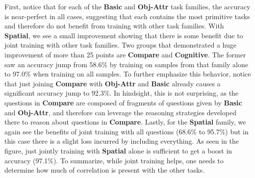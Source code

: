 First, notice that for each of the \textbf{Basic} and \textbf{Obj-Attr} task families, the accuracy is near-perfect in all cases, suggesting that each contains the most primitive tasks and therefore do not benefit from training with other task families.
With \textbf{Spatial}, we see a small improvement showing that there is some benefit due to joint training with other task families.
Two groups that demonstrated a huge improvement of more than 25 points are \textbf{Compare} and \textbf{Cognitive}.
The former saw an accuracy jump from 58.6\% by training on samples from that family alone
to 97.0\% when training on all samples. To further emphasize this behavior, notice that
just joining \textbf{Compare} with \textbf{Obj-Attr} and \textbf{Basic} already causes a significant accuracy jump to 92.3\%.
In hindsight, this is not surprising, as the questions in \textbf{Compare} are composed
of fragments of questions given by \textbf{Basic} and \textbf{Obj-Attr}, and therefore can leverage the reasoning strategies developed there to reason about questions in \textbf{Compare}.
Lastly, for the \textbf{Spatial} family, we again see the benefits of joint training with all questions (68.6\% to 95.7\%) but in this case there
is a slight loss incurred by including everything. As seen in the figure, just jointly training with \textbf{Spatial} alone is sufficient to get a boost in accuracy (97.1\%). To summarize, while joint training helps, one needs to determine how much of correlation is present with the other tasks.
